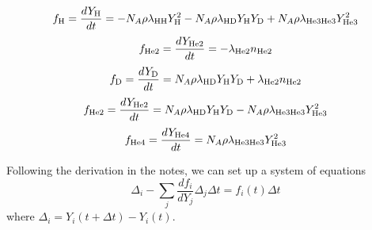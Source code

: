 \documentclass[12pt,preprint]{aastex}
\begin{document}
\begin{equation}
f_{\rm H} = \frac{dY_{\rm H}}{dt} = -N_A \rho \lambda_{\rm HH} Y_{\rm H}^2 - N_A \rho \lambda_{\rm HD}Y_{\rm H}Y_{\rm D} + N_A \rho \lambda_{\rm He3He3} Y_{\rm He3}^2 
\end{equation}
\begin{equation}
f_{\rm He2} = \frac{dY_{\rm He2}}{dt} = -\lambda_{\rm He2}n_{\rm He2}
\end{equation}
\begin{equation}
f_{\rm D} = \frac{dY_{\rm D}}{dt} = N_A \rho \lambda_{\rm HD}Y_{\rm H}Y_{\rm D} + \lambda_{\rm He2}n_{\rm He2}
\end{equation}
\begin{equation}
f_{\rm He2} = \frac{dY_{\rm He2}}{dt} =N_A \rho \lambda_{\rm HD}Y_{\rm H}Y_{\rm D} - N_A \rho \lambda_{\rm He3He3} Y_{\rm He3}^2
\end{equation}
\begin{equation}
f_{\rm He4} = \frac{dY_{\rm He4}}{dt} = N_A \rho \lambda_{\rm He3He3} Y_{\rm He3}^2
\end{equation}

Following the derivation in the notes, we can set up a system of equations
\begin{equation}
\Delta_i - \sum_{j}\frac{df_i}{dY_j}\Delta_j \Delta t = f_i(t)\Delta t
\end{equation}
where $\Delta_i = Y_i(t + \Delta t) - Y_i(t)$.

% 
%

%
\end{document}
